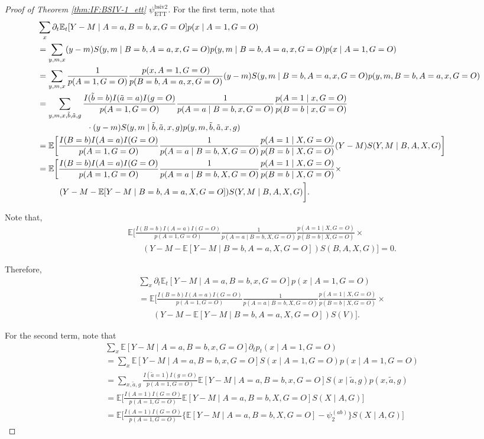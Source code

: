 \documentclass[10pt]{article}
\begin{document}
\begin{proof}[Proof of Theorem \ref{thm:IF:BSIV-1_ett} $\psi_{\text{ETT}}^{\text{bsiv2}}$]
For the first term, note that
{\footnotesize \begin{align*}
    &\sum_{x}\partial_t\mathbb{E}_t[Y-M\mid A=a,B=b,x,G=O]p(x\mid A=1, G=O)\\
    &=\sum_{y,m,x}(y-m)S(y,m\mid B=b,A=a,x,G=O)p(y,m\mid B=b,A=a,x,G=O)p(x\mid A=1, G=O)\\
    &=\sum_{y,m,x}\frac{1}{p(A=1, G=O)}\frac{p(x, A=1, G=O)}{p(B=b,A=a,x,G=O)}(y-m)S(y,m\mid B=b,A=a,x,G=O)p(y,m, B=b,A=a,x,G=O)\\
    &=\sum_{y,m,x,\Tilde{b},\Tilde{a},g}\frac{I(\Tilde{b}=b)I(\Tilde{a}=a)I(g=O)}{p(A=1, G=O)}\frac{1}{p(A=a\mid B=b,x,G=O)}\frac{p(A=1\mid x, G=O)}{p(B=b\mid x,G=O)}\\
    &~~~~~~~~~~~~~~~~~~\cdot (y-m)S(y,m\mid \Tilde{b},\Tilde{a},x,g)p(y,m, \Tilde{b},\Tilde{a},x,g)\\
    &=\mathbb{E}\bigg[\frac{I(B=b)I(A=a)I(G=O)}{p(A=1, G=O)}\frac{1}{p(A=a\mid B=b,X,G=O)}\frac{p(A=1\mid X, G=O)}{p(B=b\mid X,G=O)}(Y-M)S(Y,M\mid B,A,X,G)\bigg]\\
    &=\mathbb{E}\bigg[\frac{I(B=b)I(A=a)I(G=O)}{p(A=1, G=O)}\frac{1}{p(A=a\mid B=b,X,G=O)}\frac{p(A=1\mid X, G=O)}{p(B=b\mid X,G=O)}\times\\
    &\ \ \ \ \ \ \ \ (Y-M-\mathbb{E}[Y-M\mid B=b,A=a,X,G=O])S(Y,M\mid B,A,X,G)\bigg].
\end{align*}}

Note that,
\begin{align*}
    &\mathbb{E}\bigg[\frac{I(B=b)I(A=a)I(G=O)}{p(A=1, G=O)}\frac{1}{p(A=a\mid B=b,X,G=O)}\frac{p(A=1\mid X, G=O)}{p(B=b\mid X,G=O)}\times\\
    &\ \ \ \ \ \ \ \ (Y-M-\mathbb{E}[Y-M\mid B=b,A=a,X,G=O])S(B,A,X,G)\bigg]=0.
\end{align*}

Therefore,
\begin{align*}
    &\sum_{x}\partial_t\mathbb{E}_t[Y-M\mid A=a,B=b,x,G=O]p(x\mid A=1, G=O)\\
    &=\mathbb{E}\bigg[\frac{I(B=b)I(A=a)I(G=O)}{p(A=1, G=O)}\frac{1}{p(A=a\mid B=b,X,G=O)}\frac{p(A=1\mid X, G=O)}{p(B=b\mid X,G=O)}\times\\
    &\ \ \ \ \ \ \ \ (Y-M-\mathbb{E}[Y-M\mid B=b,A=a,X,G=O])S(V)\bigg].
\end{align*}

For the second term, note that
\begin{align*}
    &\sum_{x}\mathbb{E}[Y-M\mid A=a,B=b,x,G=O]\partial_tp_t(x\mid A=1, G=O)\\
    &=\sum_{x}\mathbb{E}[Y-M\mid A=a,B=b,x,G=O]S(x\mid A=1, G=O)p(x\mid A=1, G=O)\\
    &=\sum_{x,\tilde{a},g}\frac{I(\tilde{a}=1)I(g=O)}{p(A=1, G=O)}\mathbb{E}[Y-M\mid A=a,B=b,x,G=O]S(x\mid \tilde{a},g)p(x,\tilde{a},g)\\
    &=\mathbb{E}\bigg[\frac{I(A=1)I(G=O)}{p(A=1, G=O)}\mathbb{E}[Y-M\mid A=a,B=b,X,G=O]S(X\mid A,G)\bigg]\\
    &=\mathbb{E}\bigg[\frac{I(A=1)I(G=O)}{p(A=1, G=O)}\bigg\{\mathbb{E}[Y-M\mid A=a,B=b,X,G=O]-\psi_2^{(ab)}\bigg\}S(X\mid A,G)\bigg]
\end{align*}


\end{proof}
\end{document}
